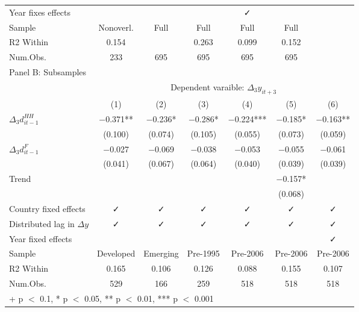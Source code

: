 \documentclass{ltjarticle}
\begin{document}
\begin{table}
\begin{center}
\begin{tabular}[h]{lcccccc}
Year fixes effects &  &  &  & ✓ & & \\
Sample & Nonoverl. & Full & Full & Full & Full &\\
R2 Within & \num{0.154} &  & \num{0.263} & \num{0.099} & \num{0.152} &\\
Num.Obs. & \num{233} & \num{695} & \num{695} & \num{695} & \num{695} &\\
\hline
\hline
\multicolumn{7}{l}{Panel B: Subsamples}\\
\hline
 & \multicolumn{6}{c}{Dependent varaible: $\Delta_{3}y_{it+3}$}\\
\cline{2-7}
  & (1) & (2) & (3) & (4) & (5) & (6)\\
\midrule
$\Delta_{3}d_{it-1}^{HH} $ & \num{-0.371}** & \num{-0.236}* & \num{-0.286}* & \num{-0.224}*** & \num{-0.185}* & \num{-0.163}**\\
 & (\num{0.100}) & (\num{0.074}) & (\num{0.105}) & (\num{0.055}) & (\num{0.073}) & (\num{0.059})\\
$\Delta_{3}d_{it-1}^{F} $ & \num{-0.027} & \num{-0.069} & \num{-0.038} & \num{-0.053} & \num{-0.055} & \num{-0.061}\\
 & (\num{0.041}) & (\num{0.067}) & (\num{0.064}) & (\num{0.040}) & (\num{0.039}) & (\num{0.039})\\
Trend &  &  &  &  & \num{-0.157}* & \\
 &  &  &  &  & (\num{0.068}) & \\
\midrule
Country fixed effects & ✓ & ✓ & ✓ & ✓ & ✓ & ✓\\
Distributed lag in $\Delta{y}$ & ✓ & ✓ & ✓ & ✓ & ✓ & ✓\\
Year fixed effects &  &  &  &  &  & ✓\\
Sample & Developed & Emerging & Pre-1995 & Pre-2006 & Pre-2006 & Pre-2006\\
R2 Within & \num{0.165} & \num{0.106} & \num{0.126} & \num{0.088} & \num{0.155} & \num{0.107}\\
Num.Obs. & \num{529} & \num{166} & \num{259} & \num{518} & \num{518} & \num{518}\\
\bottomrule
\multicolumn{7}{l}{\rule{0pt}{1em}+ p $<$ 0.1, * p $<$ 0.05, ** p $<$ 0.01, *** p $<$ 0.001}\\
\end{tabular}
\end{center}
\begin{tablenotes}
    \small

\end{tablenotes}
\end{table}
\end{document}
